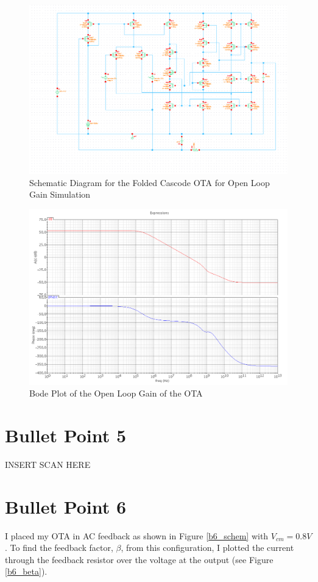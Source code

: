 \documentclass{article}
\begin{document}
\begin{figure}[H]
\centering
\includegraphics[width=7in]{bullet4_schem.png}
\caption{Schematic Diagram for the Folded Cascode OTA for Open Loop Gain Simulation}
\label{b4_schem}
\end{figure}

\begin{figure}[H]
\centering
\includegraphics[width=7in]{bullet4_bode.png}
\caption{Bode Plot of the Open Loop Gain of the OTA}
\label{b4_bode}
\end{figure}
\newpage

\section{Bullet Point 5}
INSERT SCAN HERE

\section{Bullet Point 6}
I placed my OTA in AC feedback as shown in Figure \ref{b6_schem} with $V_{cm} = 0.8V$. To find the feedback factor, $\beta$, from this configuration, I plotted the current through the feedback resistor over the voltage at the output (see Figure \ref{b6_beta}).
\end{document}
